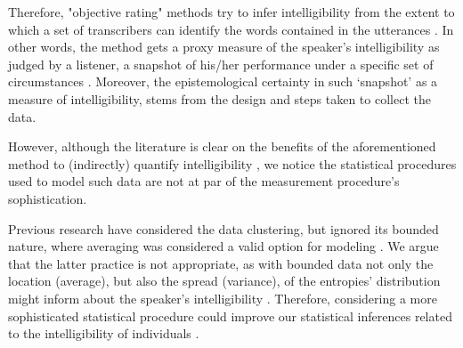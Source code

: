 \begin{comment}
	
	As the literature suggests, objective rating procedures produce more valid\footnote{validity is understood as the extent to which scores are appropriate for their intended interpretation and use \citep{Lesterhuis_2018, Trochim_2022}.} and reliable\footnote{reliability is though as the extend to which a measure would give us the same result over and over again \citep{Trochim_2022}, i.e. measure something, free from error, in a consistent way.} scores than any other available procedure \citep{Boonen_et_al_2021, Faes_et_al_2021}, as the method does not hinge in the use or production of a \textit{subjective rating scale}, i.e. a scale based on a personal perception of the child's intelligibility. Moreover, the previous advantages are further emphasized by the use of stimuli gathered from spontaneous speech tasks, as they have a greater level of ecological validity, especially compared to contextualized utterances or reading at loud tasks \citep{Flipsen_2006, Ertmer_2011}.
	
\end{comment}

Therefore, "objective rating" methods try to infer intelligibility from the extent to which a set of transcribers can identify the words contained in the utterances \citep{Boonen_et_al_2021}. In other words, the method gets a proxy measure of the speaker's intelligibility as judged by a listener, a snapshot of his/her performance under a specific set of circumstances \citep{Hustad_et_al_2020}. Moreover, the epistemological certainty in such ‘snapshot’ as a measure of intelligibility, stems from the design and steps taken to collect the data.

However, although the literature is clear on the benefits of the aforementioned method to (indirectly) quantify intelligibility \citep{Boonen_et_al_2020, Boonen_et_al_2021, Hustad_et_al_2020}, we notice the statistical procedures used to model such data are not at par of the measurement procedure's sophistication.

Previous research have considered the data clustering, but ignored its bounded nature, where averaging was considered a valid option for modeling \citep{Boonen_et_al_2021}. We argue that the latter practice is not appropriate, as with bounded data not only the location (average), but also the spread (variance), of the entropies' distribution might inform about the speaker's intelligibility \citep{Nelder_et_al_1983}. Therefore, considering a more sophisticated statistical procedure could improve our statistical inferences related to the intelligibility of individuals \citep{McElreath_2020}.

